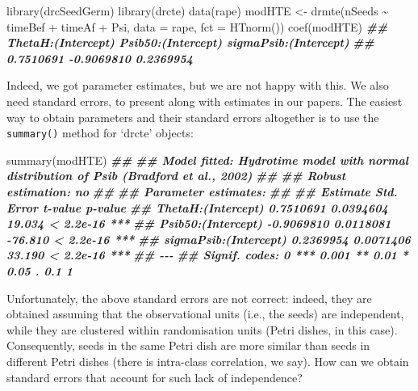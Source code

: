 \documentclass[
]{book}
\newenvironment{Shaded}{\begin{snugshade}}{\end{snugshade}}
\newcommand{\AttributeTok}[1]{\textcolor[rgb]{0.77,0.63,0.00}{#1}}
\newcommand{\DocumentationTok}[1]{\textcolor[rgb]{0.56,0.35,0.01}{\textbf{\textit{#1}}}}
\newcommand{\FunctionTok}[1]{\textcolor[rgb]{0.00,0.00,0.00}{#1}}
\newcommand{\NormalTok}[1]{#1}
\newcommand{\OtherTok}[1]{\textcolor[rgb]{0.56,0.35,0.01}{#1}}
\newcommand{\SpecialCharTok}[1]{\textcolor[rgb]{0.00,0.00,0.00}{#1}}
\begin{document}
\begin{Shaded}
\begin{Highlighting}[]
\FunctionTok{library}\NormalTok{(drcSeedGerm)}
\FunctionTok{library}\NormalTok{(drcte)}
\FunctionTok{data}\NormalTok{(rape)}
\NormalTok{modHTE }\OtherTok{\textless{}{-}} \FunctionTok{drmte}\NormalTok{(nSeeds }\SpecialCharTok{\textasciitilde{}}\NormalTok{ timeBef }\SpecialCharTok{+}\NormalTok{ timeAf }\SpecialCharTok{+}\NormalTok{ Psi, }
                \AttributeTok{data =}\NormalTok{ rape, }\AttributeTok{fct =} \FunctionTok{HTnorm}\NormalTok{())}
\FunctionTok{coef}\NormalTok{(modHTE)}
\DocumentationTok{\#\#    ThetaH:(Intercept)    Psib50:(Intercept) sigmaPsib:(Intercept) }
\DocumentationTok{\#\#             0.7510691            {-}0.9069810             0.2369954}
\end{Highlighting}
\end{Shaded}

Indeed, we got parameter estimates, but we are not happy with this. We also need standard errors, to present along with estimates in our papers. The easiest way to obtain parameters and their standard errors altogether is to use the \texttt{summary()} method for `drcte' objects:

\begin{Shaded}
\begin{Highlighting}[]
\FunctionTok{summary}\NormalTok{(modHTE)}
\DocumentationTok{\#\# }
\DocumentationTok{\#\# Model fitted: Hydrotime model with normal distribution of Psib (Bradford et al., 2002)}
\DocumentationTok{\#\# }
\DocumentationTok{\#\# Robust estimation: no }
\DocumentationTok{\#\# }
\DocumentationTok{\#\# Parameter estimates:}
\DocumentationTok{\#\# }
\DocumentationTok{\#\#                         Estimate Std. Error t{-}value   p{-}value    }
\DocumentationTok{\#\# ThetaH:(Intercept)     0.7510691  0.0394604  19.034 \textless{} 2.2e{-}16 ***}
\DocumentationTok{\#\# Psib50:(Intercept)    {-}0.9069810  0.0118081 {-}76.810 \textless{} 2.2e{-}16 ***}
\DocumentationTok{\#\# sigmaPsib:(Intercept)  0.2369954  0.0071406  33.190 \textless{} 2.2e{-}16 ***}
\DocumentationTok{\#\# {-}{-}{-}}
\DocumentationTok{\#\# Signif. codes:  0 \textquotesingle{}***\textquotesingle{} 0.001 \textquotesingle{}**\textquotesingle{} 0.01 \textquotesingle{}*\textquotesingle{} 0.05 \textquotesingle{}.\textquotesingle{} 0.1 \textquotesingle{} \textquotesingle{} 1}
\end{Highlighting}
\end{Shaded}

Unfortunately, the above standard errors are not correct: indeed, they are obtained assuming that the observational units (i.e., the seeds) are independent, while they are clustered within randomisation units (Petri dishes, in this case). Consequently, seeds in the same Petri dish are more similar than seeds in different Petri dishes (there is intra-class correlation, we say). How can we obtain standard errors that account for such lack of independence?
\end{document}
